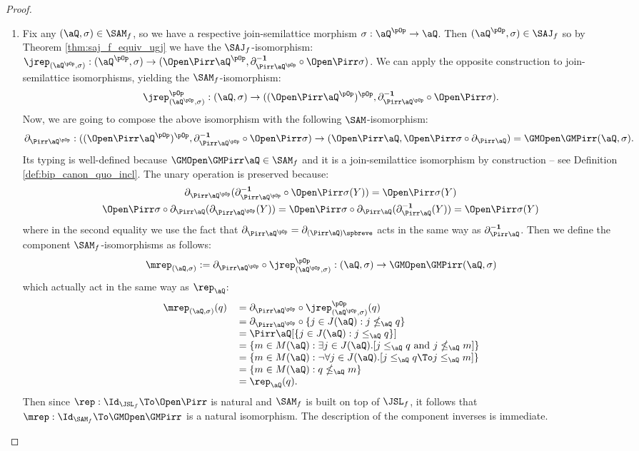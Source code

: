 \documentclass{article}
\begin{document}
\begin{proof}
\item
\begin{enumerate}
\item
Fix any $(\aQ,\sigma) \in \SAM_f$, so we have a respective join-semilattice morphism $\sigma : \aQ^{\pOp} \to \aQ$. Then $(\aQ^{\pOp},\sigma) \in \SAJ_f$ so by Theorem \ref{thm:saj_f_equiv_ugj} we have the $\SAJ_f$-isomorphism:
$\jrep_{(\aQ^{\pOp},\sigma)} : (\aQ^{\pOp},\sigma) \to (\Open\Pirr\aQ^{\pOp},\partial_{\Pirr\aQ^{\pOp}}^{\bf-1} \circ \Open\Pirr\sigma)$. We can apply the opposite construction to join-semilattice isomorphisms, yielding the $\SAM_f$-isomorphism:
\[
\jrep_{(\aQ^{\pOp},\sigma)}^{\pOp} : (\aQ,\sigma) \to ((\Open\Pirr\aQ^{\pOp})^{\pOp},\partial_{\Pirr\aQ^{\pOp}}^{\bf-1} \circ \Open\Pirr\sigma).
\]
Now, we are going to compose the above isomorphism with the following $\SAM$-isomorphism:
\[
\partial_{\Pirr\aQ^{\pOp}} : ((\Open\Pirr\aQ^{\pOp})^{\pOp},\partial_{\Pirr\aQ^{\pOp}}^{\bf-1} \circ \Open\Pirr\sigma) \to (\Open\Pirr\aQ, \Open\Pirr\sigma \circ \partial_{\Pirr\aQ}) = \GMOpen\GMPirr(\aQ,\sigma).
\]
Its typing is well-defined because $\GMOpen\GMPirr\aQ \in \SAM_f$ and it is a join-semilattice isomorphism by construction -- see Definition \ref{def:bip_canon_quo_incl}. The unary operation is preserved because:
\[
\begin{tabular}{c}
$\partial_{\Pirr\aQ^{\pOp}}( \partial_{\Pirr\aQ^{\pOp}}^{\bf-1} \circ \Open\Pirr\sigma (Y))
=  \Open\Pirr\sigma(Y)$
\\[1ex]
$\Open\Pirr\sigma \circ \partial_{\Pirr\aQ}( \partial_{\Pirr\aQ^{\pOp}}(Y))
= \Open\Pirr\sigma \circ \partial_{\Pirr\aQ}( \partial_{\Pirr\aQ}^{\bf-1}(Y)) 
= \Open\Pirr\sigma(Y)$
\end{tabular}
\]
where in the second equality we use the fact that $\partial_{\Pirr\aQ^{\pOp}} = \partial_{(\Pirr\aQ)\spbreve}$ acts in the same way as $\partial_{\Pirr\aQ}^{\bf-1}$. Then we define the component $\SAM_f$-isomorphisms as follows:
\[
\mrep_{(\aQ,\sigma)} := \partial_{\Pirr\aQ^{\pOp}} \circ \jrep_{(\aQ^{\pOp},\sigma)}^{\pOp} :
(\aQ,\sigma) \to \GMOpen\GMPirr(\aQ,\sigma)
\]
which actually act in the same way as $\rep_\aQ$:
\[
\begin{tabular}{lll}
$\mrep_{(\aQ,\sigma)}(q)$
&
$= \partial_{\Pirr\aQ^{\pOp}} \circ \jrep_{(\aQ^{\pOp},\sigma)}^{\pOp}(q)$
\\&
$= \partial_{\Pirr\aQ^{\pOp}} \circ \{ j \in J(\aQ) : j \nleq_\aQ q \}$
\\&
$= \Pirr\aQ[\{ j \in J(\aQ) : j \leq_\aQ q \}]$
\\&
$= \{ m \in M(\aQ) : \exists j \in J(\aQ).[ j \leq_\aQ q \text{ and } j \nleq_\aQ m ] \}$
\\&
$= \{ m \in M(\aQ) : \neg\forall j \in J(\aQ).[ j \leq_\aQ q \To j \leq_\aQ m ] \}$
\\&
$= \{ m \in M(\aQ) : q \nleq_\aQ m \}$
\\&
$= \rep_\aQ(q)$.
\end{tabular}
\]
Then since $\rep : \Id_{\JSL_f} \To \Open\Pirr$ is natural and $\SAM_f$ is built on top of $\JSL_f$, it follows that $\mrep : \Id_{\SAM_f} \To \GMOpen\GMPirr$ is a natural isomorphism. The description of the component inverses is immediate.


\end{enumerate}
\end{proof}
\end{document}
